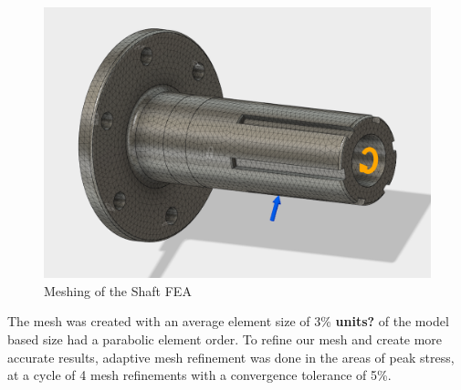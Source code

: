 \documentclass[main.tex]{subfiles}
\begin{document}
    \begin{figure}[H]
        \centering
        \includegraphics[width=\linewidth]{images/fig15}
        \caption{Meshing of the Shaft FEA}
    \end{figure}
    The mesh was created with an average element size of 3\% \textbf{units?} of the model based size had a parabolic element order. To refine our mesh and create more accurate results, adaptive mesh refinement was done in the areas of peak stress, at a cycle of 4 mesh refinements with a convergence tolerance of 5\%.
    
\end{document}
